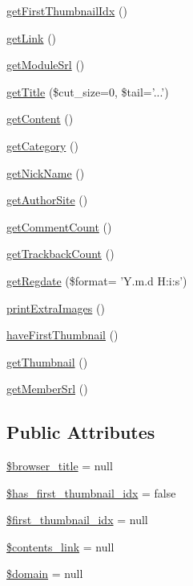 \begin{DoxyCompactItemize}
\item 
\hyperlink{classmcontentItem_acb7e5ab4fbeac716585618eba64960aa}{get\+First\+Thumbnail\+Idx} ()
\item 
\hyperlink{classmcontentItem_a5a2cad58644aabb016942e427998f32c}{get\+Link} ()
\item 
\hyperlink{classmcontentItem_a9b9841e39ff3ee331679270f9e075203}{get\+Module\+Srl} ()
\item 
\hyperlink{classmcontentItem_a180633138fb77537e7da900074aa7454}{get\+Title} (\$cut\+\_\+size=0, \$tail='...')
\item 
\hyperlink{classmcontentItem_a19b333e6ff14db6f7f77c3f94471bdff}{get\+Content} ()
\item 
\hyperlink{classmcontentItem_ae8d1d6e76cc1cfa79d544d47acaedbcc}{get\+Category} ()
\item 
\hyperlink{classmcontentItem_a8182db3f99934760d5f52082b233a1cb}{get\+Nick\+Name} ()
\item 
\hyperlink{classmcontentItem_a90fc323e4d3cf2661e6af5e51babd05f}{get\+Author\+Site} ()
\item 
\hyperlink{classmcontentItem_ac60221ec5be0a8158c5248c09efd8fb1}{get\+Comment\+Count} ()
\item 
\hyperlink{classmcontentItem_afb955c421fa34f36c51edd795d3a00c7}{get\+Trackback\+Count} ()
\item 
\hyperlink{classmcontentItem_a9f7a6c2fc454c1d7e7524504141f3fc1}{get\+Regdate} (\$format= 'Y.\+m.\+d H\+:i\+:s')
\item 
\hyperlink{classmcontentItem_a0cd7ac4bbaf7e7561f5597920c691f9d}{print\+Extra\+Images} ()
\item 
\hyperlink{classmcontentItem_ac8b5fb3d84cdc8a96a8c02e9472e25dd}{have\+First\+Thumbnail} ()
\item 
\hyperlink{classmcontentItem_a25e5c63dceabc33afe0b5ce5b3ddafcf}{get\+Thumbnail} ()
\item 
\hyperlink{classmcontentItem_ab7ad6741a93ab7d631f78bf1253f6800}{get\+Member\+Srl} ()
\end{DoxyCompactItemize}
\subsection*{Public Attributes}
\begin{DoxyCompactItemize}
\item 
\hyperlink{classmcontentItem_afdef241bedb2d1829475b7bb623cecf7}{\$browser\+\_\+title} = null
\item 
\hyperlink{classmcontentItem_a8c95afa6c7bcad64626c9f343e77cdd4}{\$has\+\_\+first\+\_\+thumbnail\+\_\+idx} = false
\item 
\hyperlink{classmcontentItem_a358e826e3ee863300d43b12a8218a5fa}{\$first\+\_\+thumbnail\+\_\+idx} = null
\item 
\hyperlink{classmcontentItem_afdee32faf59897fa7e02f9ed4389b411}{\$contents\+\_\+link} = null
\item 
\hyperlink{classmcontentItem_ad92b662d98d23cb2a10747de7ffdada0}{\$domain} = null
\end{DoxyCompactItemize}


